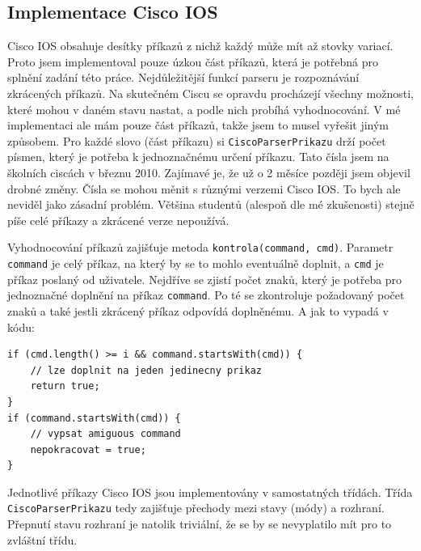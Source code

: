 \subsection{Implementace Cisco IOS}
Cisco IOS obsahuje desítky příkazů z nichž každý může mít až stovky variací. Proto jsem implementoval pouze úzkou část příkazů, která je potřebná pro splnění zadání této práce. Nejdůležitější funkcí parseru je rozpoznávání zkrácených příkazů. Na skutečném Ciscu se opravdu procházejí všechny možnosti, které mohou v daném stavu nastat, a podle nich probíhá vyhodnocování. V mé implementaci ale mám pouze část příkazů, takže jsem to musel vyřešit jiným způsobem. Pro každé slovo (část příkazu) si \verb|CiscoParserPrikazu| drží počet písmen, který je potřeba k jednoznačnému určení příkazu. Tato čísla jsem  na školních ciscách v březnu 2010. Zajímavé je, že už o 2 měsíce později jsem objevil drobné změny. Čísla se mohou měnit s různými verzemi Cisco IOS. To bych ale neviděl jako zásadní problém. Většina studentů (alespoň dle mé zkušenosti) stejně píše celé příkazy a zkrácené verze nepoužívá.

Vyhodnocování příkazů zajišťuje metoda \verb|kontrola(command, cmd)|. Parametr \verb|command| je celý příkaz, na který by se to mohlo eventuálně doplnit, a \verb|cmd| je příkaz poslaný od uživatele. Nejdříve se zjistí počet znaků, který je potřeba pro jednoznačné doplnění na příkaz \verb|command|. Po té se zkontroluje požadovaný počet znaků a také jestli zkrácený příkaz odpovídá doplněnému. A jak to vypadá v kódu:

\begin{verbatim}
if (cmd.length() >= i && command.startsWith(cmd)) {
    // lze doplnit na jeden jedinecny prikaz
    return true;
}
if (command.startsWith(cmd)) {
    // vypsat amiguous command
    nepokracovat = true;
}
\end{verbatim}

Jednotlivé příkazy Cisco IOS jsou implementovány v samostatných třídách. Třída \\\verb|CiscoParserPrikazu| tedy zajišťuje přechody mezi stavy (módy) a  rozhraní. Přepnutí stavu rozhraní je natolik triviální, že se by se nevyplatilo mít pro to zvláštní třídu. 

